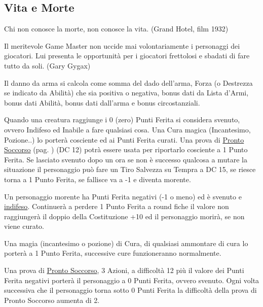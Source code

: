 \pagebreak

\subsection{Vita e Morte}\label{morire}

\begin{enfasi}{Chi non conosce la morte, non conosce la vita. (Grand Hotel, film 1932)

\medskip

Il meritevole Game Master non uccide mai volontariamente i personaggi dei giocatori. Lui presenta le opportunità per i giocatori frettolosi e sbadati di fare tutto da soli. (Gary Gygax)}\end{enfasi}

\begin{multicols}{2}

Il danno da arma si calcola come somma del dado dell'arma, Forza (o Destrezza se indicato da Abilità) che sia positiva o negativa, bonus dati da Lista d'Armi, bonus dati Abilità, bonus dati dall'arma e bonus circostanziali.

Quando una creatura raggiunge i 0 (zero) Punti Ferita si considera svenuto, ovvero Indifeso ed Inabile a fare qualsiasi cosa. Una Cura magica (Incantesimo, Pozione..) lo porterà cosciente ed ai Punti Ferita curati. Una prova di \hyperlink{prontosoccorso}{Pronto Soccorso} (pag. \pageref{prontosoccorso}) (DC 12) potrà essere usata per riportarlo cosciente a 1 Punto Ferita.
Se lasciato svenuto dopo un ora se non è successo qualcosa a mutare la situazione il personaggio può fare un Tiro Salvezza su Tempra a DC 15, se riesce torna a 1 Punto Ferita, se fallisce va a -1 e diventa morente.

Un personaggio morente ha Punti Ferita negativi (-1 o meno) ed è svenuto e \hyperlink{morente}{indifeso}. Continuerà a perdere 1 Punto Ferita a round fiche il valore non raggiungerà il doppio della Costituzione +10 ed il personaggio morirà, se non viene curato.

Una magia (incantesimo o pozione) di Cura, di qualsiasi ammontare di cura lo porterà a 1 Punto Ferita, successive cure funzioneranno normalmente.

Una prova di \hyperlink{prontosoccorso}{Pronto Soccorso}, 3 Azioni, a difficoltà 12 più il valore dei Punti Ferita negativi porterà il personaggio a 0 Punti Ferita, ovvero svenuto. Ogni volta successiva che il personaggio torna sotto 0 Punti Ferita la difficoltà della prova di Pronto Soccorso aumenta di 2.


\end{multicols}
